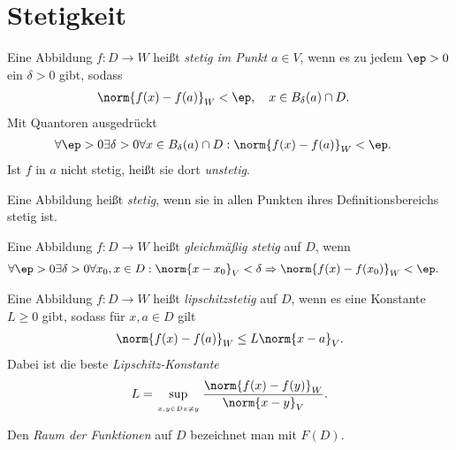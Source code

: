 \section{Stetigkeit}

\begin{defn} Eine Abbildung $f: D\to W$ heißt \emph{stetig im Punkt} $a\in V$,
wenn es zu jedem $\ep > 0$ ein $\delta > 0$ gibt, sodass
\begin{align*}
&\norm{f(x)-f(a)}_W < \ep,\quad x\in B_\delta(a) \cap D.
\end{align*}
Mit Quantoren ausgedrückt
\begin{align*}
&\forall \ep > 0 \exists \delta > 0 \forall x\in B_\delta(a) \cap D :
\norm{f(x)-f(a)}_W < \ep.
\end{align*}
Ist $f$ in $a$ nicht stetig, heißt sie dort \emph{unstetig}.
\end{defn}
\begin{defn}
Eine Abbildung heißt \emph{stetig}, wenn sie in allen Punkten ihres
Definitionsbereichs stetig ist.
\end{defn}
\begin{defn} Eine Abbildung $f: D\to W$ heißt \emph{gleichmäßig stetig} auf $D$,
wenn
\begin{align*}
&\forall \ep > 0 \exists \delta > 0 \forall x_0,x \in D : \norm{x-x_0}_V <
\delta \Rightarrow \norm{f(x)-f(x_0)}_W < \ep.
\end{align*}
\end{defn}
\begin{defn} Eine Abbildung $f: D\to W$ heißt \emph{lipschitzstetig} auf $D$,
wenn es eine Konstante $L\ge 0$ gibt, sodass für $x,a\in D$ gilt
\begin{align*}
\norm{f(x)-f(a)}_W \le L \norm{x-a}_V.
\end{align*} 
Dabei ist die beste \emph{Lipschitz-Konstante}
\begin{align*}
L = \sup \limits_{\atop{x,y\in
D}{x\neq y}} \frac{\norm{f(x)- f(y)}_W}{\norm{x-y}_V}.
\end{align*}
\end{defn}
\begin{defn}
Den \emph{Raum der Funktionen} auf $D$ bezeichnet man mit \emph{$F(D)$}.
\end{defn}
